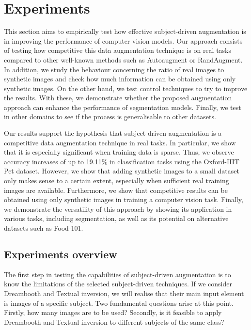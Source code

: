 \chapter{Experiments} \label{sec:experiments}

This section aims to empirically test how effective subject-driven augmentation is in improving the performance of computer vision models. Our approach consists of testing how competitive this data augmentation technique is on real tasks compared to other well-known methods such as Autoaugment or RandAugment. In addition, we study the behaviour concerning the ratio of real images to synthetic images and check how much information can be obtained using only synthetic images. On the other hand, we test control techniques to try to improve the results. With these, we demonstrate whether the proposed augmentation approach can enhance the performance of segmentation models. Finally, we test in other domains to see if the process is generalisable to other datasets.

Our results support the hypothesis that subject-driven augmentation is a competitive data augmentation technique in real tasks. In particular, we show that it is especially significant when training data is sparse. Thus, we observe accuracy increases of up to 19.11\% in classification tasks using the Oxford-IIIT Pet dataset. However, we show that adding synthetic images to a small dataset only makes sense to a certain extent, especially when sufficient real training images are available. Furthermore, we show that competitive results can be obtained using only synthetic images in training a computer vision task. Finally, we demonstrate the versatility of this approach by showing its application in various tasks, including segmentation, as well as its potential on alternative datasets such as Food-101.

\section{Experiments overview} \label{sec:experimentsO}

The first step in testing the capabilities of subject-driven augmentation is to know the limitations of the selected subject-driven techniques. If we consider Dreambooth and Textual inversion, we will realise that their main input element is images of a specific subject. Two fundamental questions arise at this point. Firstly, how many images are to be used? Secondly, is it feasible to apply Dreambooth and Textual inversion to different subjects of the same class?

